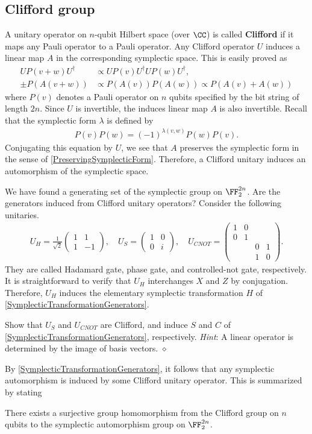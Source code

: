 \subsection{Clifford group}

A unitary operator on $n$-qubit Hilbert space (over $\CC$) is called {\bf Clifford} 
if it maps any Pauli operator to a Pauli operator.
Any Clifford operator $U$ induces a linear map $A$ in the corresponding symplectic space.
This is easily proved as
\begin{align*}
U P( v + w) U^\dagger &\propto UP(v)U^\dagger UP(w)U^\dagger,\\
\pm P( A(v+w) ) &\propto P(A(v)) P(A(w)) \propto P(A(v) + A(w))
\end{align*}
where $P(v)$ denotes a Pauli operator on $n$ qubits
specified by the bit string of length $2n$.
Since $U$ is invertible, the induces linear map $A$ is also invertible.
Recall that the symplectic form $\lambda$ is defined by
\begin{align}
 P(v)P(w) = (-1)^{\lambda(v,w)} P(w) P(v).
\end{align}
Conjugating this equation by $U$,
we see that $A$ preserves the symplectic form in the sense of \eqref{PreservingSymplecticForm}.
Therefore, a Clifford unitary induces an automorphism of the symplectic space.

We have found a generating set of the symplectic group on $\FF_2^{2n}$.
Are the generators induced from Clifford unitary operators?
Consider the following unitaries.
\begin{align}
 U_H = \frac{1}{\sqrt{2}} \begin{pmatrix} 1 & 1 \\ 1 & -1 \end{pmatrix}, \quad
 U_S = \begin{pmatrix} 1 & 0 \\ 0 & i \end{pmatrix}, \quad
 U_{CNOT} = \begin{pmatrix} 1 & 0 & & \\ 0 & 1 & & \\ & & 0 & 1 \\ & & 1 & 0 \end{pmatrix}.
\label{CliffordGenerators}
\end{align}
They are called Hadamard gate, phase gate, and controlled-not gate, respectively.
It is straightforward to verify that $U_H$ interchanges $X$ and $Z$ by conjugation.
Therefore, $U_H$ induces the elementary symplectic transformation $H$ of \ref{SymplecticTransformationGenerators}.
\begin{exc}
Show that $U_S$ and $U_{CNOT}$ are Clifford, 
and induce $S$ and $C$ of \ref{SymplecticTransformationGenerators}, respectively.
{\em Hint}: A linear operator is determined by the image of basis vectors.
\hfill $\diamond$ \end{exc}
By \ref{SymplecticTransformationGenerators}, it follows that any symplectic automorphism
is induced by some Clifford unitary operator. This is summarized by stating
\begin{prop}
There exists a surjective group homomorphism from the Clifford group on $n$ qubits 
to the symplectic automorphism group on $\FF_2^{2n}$.
\end{prop}

